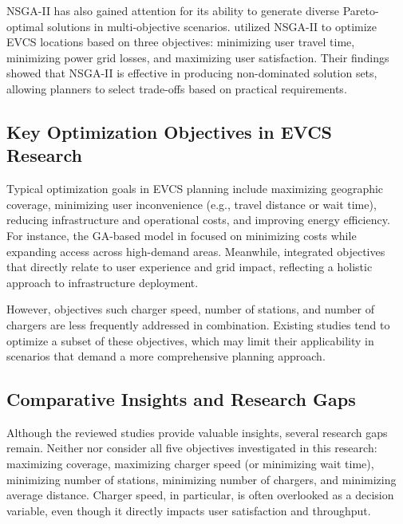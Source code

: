NSGA-II has also gained attention for its ability to generate diverse Pareto-optimal solutions in multi-objective scenarios. \citet{A multi-objective optimization model for electric vehicle charging station location planning} utilized NSGA-II to optimize EVCS locations based on three objectives: minimizing user travel time, minimizing power grid losses, and maximizing user satisfaction. Their findings showed that NSGA-II is effective in producing non-dominated solution sets, allowing planners to select trade-offs based on practical requirements.

\subsection{Key Optimization Objectives in EVCS Research}

Typical optimization goals in EVCS planning include maximizing geographic coverage, minimizing user inconvenience (e.g., travel distance or wait time), reducing infrastructure and operational costs, and improving energy efficiency. For instance, the GA-based model in \cite{A genetic algorithm-based optimization for the location of electric vehicle charging stations} focused on minimizing costs while expanding access across high-demand areas. Meanwhile, \cite{A multi-objective optimization model for electric vehicle charging station location planning} integrated objectives that directly relate to user experience and grid impact, reflecting a holistic approach to infrastructure deployment.

However, objectives such charger speed, number of stations, and number of chargers are less frequently addressed in combination. Existing studies tend to optimize a subset of these objectives, which may limit their applicability in scenarios that demand a more comprehensive planning approach.

\subsection{Comparative Insights and Research Gaps}

Although the reviewed studies provide valuable insights, several research gaps remain. Neither \cite{A multi-objective optimization model for electric vehicle charging station location planning} nor \cite{A genetic algorithm-based optimization for the location of electric vehicle charging stations} consider all five objectives investigated in this research: maximizing coverage, maximizing charger speed (or minimizing wait time), minimizing number of stations, minimizing number of chargers, and minimizing average distance. Charger speed, in particular, is often overlooked as a decision variable, even though it directly impacts user satisfaction and throughput.

